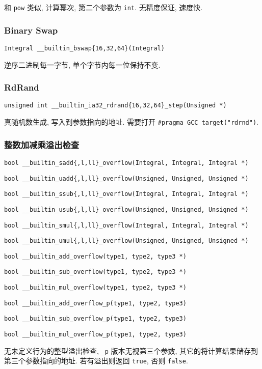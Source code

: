 和 \lstinline{pow} 类似, 计算幂次, 第二个参数为 \lstinline{int}. 无精度保证, 速度快.

\subsubsection{Binary Swap}
\lstinline|Integral __builtin_bswap{16,32,64}(Integral)|

逆序二进制每一字节, 单个字节内每一位保持不变.

\subsubsection{RdRand}
\lstinline|unsigned int __builtin_ia32_rdrand{16,32,64}_step(Unsigned *)|

真随机数生成, 写入到参数指向的地址. 需要打开 \lstinline{#pragma GCC target("rdrnd")}.

\subsubsection{整数加减乘溢出检查}

\lstinline|bool __builtin_sadd{,l,ll}_overflow(Integral, Integral, Integral *)|

\lstinline|bool __builtin_uadd{,l,ll}_overflow(Unsigned, Unsigned, Unsigned *)|

\lstinline|bool __builtin_ssub{,l,ll}_overflow(Integral, Integral, Integral *)|

\lstinline|bool __builtin_usub{,l,ll}_overflow(Unsigned, Unsigned, Unsigned *)|

\lstinline|bool __builtin_smul{,l,ll}_overflow(Integral, Integral, Integral *)|

\lstinline|bool __builtin_umul{,l,ll}_overflow(Unsigned, Unsigned, Unsigned *)|

\lstinline|bool __builtin_add_overflow(type1, type2, type3 *)|

\lstinline|bool __builtin_sub_overflow(type1, type2, type3 *)|

\lstinline|bool __builtin_mul_overflow(type1, type2, type3 *)|

\lstinline|bool __builtin_add_overflow_p(type1, type2, type3)|

\lstinline|bool __builtin_sub_overflow_p(type1, type2, type3)|

\lstinline|bool __builtin_mul_overflow_p(type1, type2, type3)|

无未定义行为的整型溢出检查, \lstinline{_p} 版本无视第三个参数, 其它的将计算结果储存到第三个参数指向的地址. 若有溢出则返回 \lstinline{true}, 否则 \lstinline{false}.

